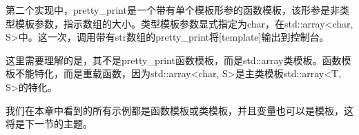 第二个实现中，pretty\_print是一个带有单个模板形参的函数模板，该形参是非类型模板参数，指示数组的大小。类型模板参数显式指定为char，在std::array<char, S>中。这一次，调用带有str数组的pretty\_print将[template]输出到控制台。

这里需要理解的是，其不是pretty\_print函数模板，而是std::array类模板。函数模板不能特化，而是重载函数，因为std::array<char, S>是主类模板std::array<T, S>的特化。

我们在本章中看到的所有示例都是函数模板或类模板，并且变量也可以是模板，这将是下一节的主题。


